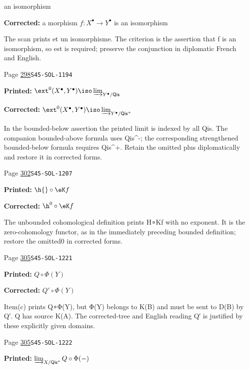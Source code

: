 \begin{description}
an isomorphism
\par\noindent\textbf{Corrected:} a morphism $f:X^\bullet \to Y^\bullet$ is
an isomorphism
\par\noindent The scan prints et un isomorphisme. The criterion is the assertion that f is an isomorphism, so est is required; preserve the conjunction in diplomatic French and English.
\smallskip
\item[\hypertarget{apparatus:EN-0209}{209}] Page \hyperlink{printpage:en:298}{298}\quad\texttt{S45-SOL-1194}
\par\noindent\textbf{Printed:} \(\ext^0(X^\bullet,Y^\bullet) \iso \varinjlim_{Y^\bullet/\mathsf{Qis}}\)
\par\noindent\textbf{Corrected:} \(\ext^0(X^\bullet,Y^\bullet) \iso \varinjlim_{Y^\bullet/\mathsf{Qis}^+}\)
\par\noindent In the bounded-below assertion the printed limit is indexed by all Qis. The companion bounded-above formula uses Qis\textasciicircum{}-; the corresponding strengthened bounded-below formula requires Qis\textasciicircum{}+. Retain the omitted plus diplomatically and restore it in corrected forms.
\smallskip
\item[\hypertarget{apparatus:EN-0210}{210}] Page \hyperlink{printpage:en:302}{302}\quad\texttt{S45-SOL-1207}
\par\noindent\textbf{Printed:} \(\h{}\circ \eK f\)
\par\noindent\textbf{Corrected:} \(\h^0{}\circ \eK f\)
\par\noindent The unbounded cohomological definition prints H∘Kf with no exponent. It is the zero-cohomology functor, as in the immediately preceding bounded definition; restore the omitted0 in corrected forms.
\smallskip
\item[\hypertarget{apparatus:EN-0211}{211}] Page \hyperlink{printpage:en:305}{305}\quad\texttt{S45-SOL-1221}
\par\noindent\textbf{Printed:} $Q\circ \Phi(Y)$
\par\noindent\textbf{Corrected:} $Q'\circ \Phi(Y)$
\par\noindent Item(c) prints Q∘Φ(Y), but Φ(Y) belongs to K(B) and must be sent to D(B) by Q′. Q has source K(A). The corrected-tree and English reading Q′ is justified by these explicitly given domains.
\smallskip
\item[\hypertarget{apparatus:EN-0212}{212}] Page \hyperlink{printpage:en:305}{305}\quad\texttt{S45-SOL-1222}
\par\noindent\textbf{Printed:} \(\varinjlim_{X/\mathsf{Qis}^\ast} Q\circ\Phi(-)\)

\end{description}
